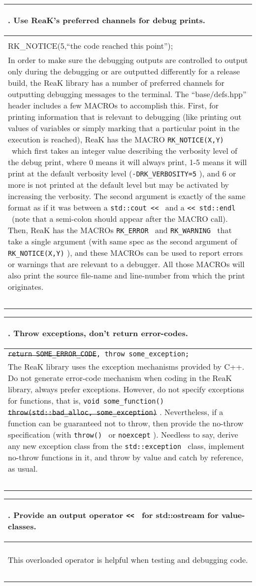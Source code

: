 \documentclass[10pt]{article}
\newcommand{\code}[1]{\color[rgb]{0.2,0.8,0.2}\texttt{#1}\color[rgb]{0,0,0} }
\newcounter {iCommandment}
\newcommand{\CorG}[5]
{
\begin{table}[H]
\begin{center}
\begin{tabular}{| p{12cm} |}
\hline
#1. #2 \\
\hline
\vspace{-0.1cm}
\parbox{12cm}{\code{#3}} \\
\vspace{-0.2cm}
#4 \\
#5 \\
\hline
\end{tabular}
\end{center}
\end{table}
}
\newcommand{\Commandment}[4]
{
\CorG{\textbf{\arabic{iCommandment}}\addtocounter{iCommandment}{1}}
{\textbf{#1}}{#2}{#3}{#4}
}
\begin{document}
\Commandment
{Use ReaK's preferred channels for debug prints.}
{\sout{std::cout << ``the code reached this point'' << std::endl;}\\
 RK\_NOTICE(5,``the code reached this point'');}
{In order to make sure the debugging outputs are controlled to output only during the debugging or are 
outputted differently for a release build, the ReaK library has a number of preferred channels for outputting
debugging messages to the terminal. The ``base/defs.hpp'' header includes a few MACROs to accomplish this. First,
for printing information that is relevant to debugging (like printing out values of variables or simply marking 
that a particular point in the execution is reached), ReaK has the MACRO \code{RK\_NOTICE(X,Y)}\ which first takes an 
integer value describing the verbosity level of the debug print, where 0 means it will always print, 1-5 means it 
will print at the default verbosity level (\code{-DRK\_VERBOSITY=5}), and 6 or more is not printed at the default level but may be activated 
by increasing the verbosity. The second argument is exactly of the same format as if it was between a \code{std::cout <<}\ and a
\code{<< std::endl}\ (note that a semi-colon should appear after the MACRO call). Then, ReaK has the MACROs 
\code{RK\_ERROR}\ and \code{RK\_WARNING}\ that take a single argument (with same spec as the second argument 
of \code{RK\_NOTICE(X,Y)}), and these MACROs can be used to report errors or warnings that are relevant to a debugger.
All those MACROs will also print the source file-name and line-number from which the print originates.}
{\ }

\Commandment
{Throw exceptions, don't return error-codes.}
{\sout{return SOME\_ERROR\_CODE}, throw some\_exception; }
{The ReaK library uses the exception mechanisms provided by C++. Do not generate error-code mechanism when 
coding in the ReaK library, always prefer exceptions. However, do not specify exceptions for functions, that is,
\code{void some\_function() \sout{throw(std::bad\_alloc, some\_exception)}}. Nevertheless, if a function can be 
guaranteed not to throw, then provide the no-throw specification (with \code{throw()}\ or \code{noexcept}).
Needless to say, derive any new exception class from the \code{std::exception}\ class, implement no-throw 
functions in it, and throw by value and catch by reference, as usual.}
{\ }

\Commandment
{Provide an output operator \code{<<}\ for std::ostream for value-classes.}
{\ }
{This overloaded operator is helpful when testing and debugging code.}
{\ }
\end{document}
